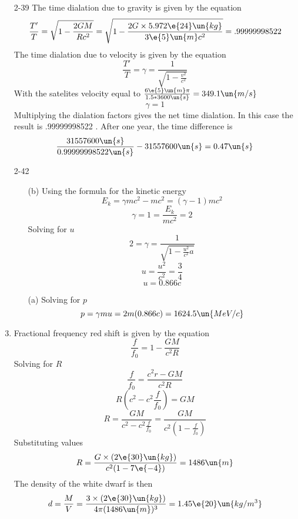 \documentclass{2620hw}
\begin{document}
\begin{enumerate}
	\item [2-39] The time dialation due to gravity is given by the equation
	\[
		\frac{T'}{T}  = \sqrt{ 1 - \frac{2GM}{Rc^2}} = \sqrt{ 1 - \frac{2G \times 5.972\e{24}\un{kg} }{3\e{5}\un{m }c^2} } = .99999998522 
	\]
	The time dialation due to velocity is given by the equation 
	\[
		\frac{T'}{T} = \gamma = \frac{1}{\sqrt{ 1 - \frac{v^2}{c^2}}} 
	\]
	With the satelites velocity equal to $\frac{6\e{5}\un{m}\pi}{1.5*3600 \un{s}} =  349.1 \un{m/s}$
	\[
		\gamma = 1 
	\]
	Multiplying the dialation factors gives the net time dialation. In this case the result is .99999998522 . 
 After one year, the time difference is 
	\[
	\frac{31557600\un{s}}{0.99999998522\un{s}} - 31557600\un{s} =  0.47\un{s}
	\]


	\item [2-42]
	\begin{enumerate}
	
	\item [(b)]Using the formula for the kinetic energy
	\[
	E_k = \gamma mc^2 - mc^2 = (\gamma-1)mc^2
	\]
	\[
		\gamma = 1 = \frac{E_k}{mc^2}  = 2
	\]
	Solving for $u$
	\[
		2 = \gamma  = 	\frac{1}{\sqrt{1 - \frac{u^2}{c^2} a}}
	\]
	\[
		u = \frac{u^2}{c^2}  = \frac{3}{4} 
	\]
	\[
		u = 0.866c
	\]
	

	\item [(a)] Solving for $p$
	\[
		p = \gamma mu = 2m(0.866c) = 1624.5\un{MeV/c}
	\]
	
	\end{enumerate}

	\item Fractional frequency  red shift is given by the equation
	\[
		\frac{f}{f_0} = 1 - \frac{GM}{c^2R} 
	\]
	Solving for $R$
	\[
		\frac{f}{f_0}  = \frac{c^2r-GM}{c^2R} 
	\]
	\[
		R\left(c^2-c^2 \frac{f}{f_0} \right) = GM
	\]
	\[
		R = \frac{GM}{c^2-c^2 \frac{f}{f_0} } =  \frac{GM}{c^2\left(1- \frac{f}{f_0}\right)} 
	\]
	Substituting values
	\[
		R = \frac{G \times (2\e{30}\un{kg})}{c^2(1-7\e{-4})} = 1486 \un{m} 
	\]
	The density of the white dwarf is then
	\[
		d = \frac{M}{V} =  \frac{3 \times (2\e{30}\un{kg})}{4 \pi (1486\un{m})^3} = 1.45\e{20}\un{kg/m^3}
	\]

\end{enumerate}
\end{document}
